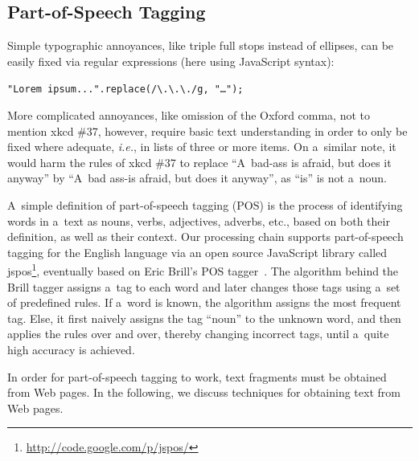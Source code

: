 \documentclass{sig-alternate}
\let\oldemph\emph
\renewcommand{\emph}[1]{\oldemph{\fontsize{9}{9}\selectfont #1}}
\newcommand{\inlinelistingsize}{\fontsize{8pt}{11pt}}
\let\oldurl\url
\renewcommand{\url}[1]{\inlinelistingsize\oldurl{#1}}
\begin{document}
\subsection{Part-of-Speech Tagging}
Simple typographic annoyances, like triple full stops instead of ellipses, can be easily fixed via regular expressions (here using JavaScript syntax):

\noindent \texttt{"Lorem ipsum...".replace(/\textbackslash.\textbackslash.\textbackslash./g, "\ldots");}

More complicated annoyances, like omission of the Oxford comma, not to mention xkcd \#37, however,
require basic text understanding in order to only be fixed where adequate, \emph{i.e.}, 
in lists of three or more items.
On a~similar note, it would harm the rules of xkcd \#37 to replace ``A~bad-ass is afraid, but does it anyway'' by ``A~bad ass-is afraid, but does it anyway'', as ``is'' is not a~noun.

A~simple definition of part-of-speech tagging (POS) is the process of identifying words in a~text as nouns, verbs, adjectives, adverbs, etc., based on both their definition, as well as their context.
Our processing chain supports part-of-speech tagging for the English language via an open source JavaScript library called jspos\footnote{\url{http://code.google.com/p/jspos/}},
eventually based on Eric Brill's POS tagger~\cite{brill1992simple}.
The algorithm behind the Brill tagger assigns a~tag to each word and later changes those tags using a~set of predefined rules.
If a~word is known, the algorithm assigns the most frequent tag.
Else, it first naively assigns the tag ``noun'' to the unknown word,
and then applies the rules over and over, thereby changing incorrect tags,
until a~quite high accuracy is achieved.

In order for part-of-speech tagging to work, text fragments must be obtained from Web pages.
In the following, we discuss techniques for obtaining text from Web pages.
\end{document}
